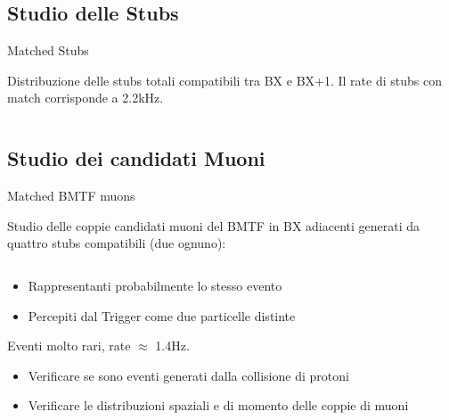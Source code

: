 \documentclass{beamer}
\begin{document}
\subsection{Studio delle Stubs}
\begin{frame}{Matched Stubs}

Distribuzione delle stubs totali compatibili tra BX e BX+1. Il rate di stubs con match corrisponde a 2.2kHz. 

\vspace{0.6cm}

\begin{columns}

    \begin{column}{0.5\textwidth}
    \end{column}
    \begin{column}{0.5\textwidth}
    \end{column}
\end{columns}

\vspace{0.5 cm}
    
\end{frame}


\subsection{Studio dei candidati Muoni}

\begin{frame}{Matched BMTF muons}

Studio delle coppie candidati muoni del BMTF in BX adiacenti generati da quattro stubs compatibili (due ognuno):

\begin{columns}

    \begin{column}{0.55\textwidth}
    \begin{itemize}
        \item Rappresentanti probabilmente lo stesso evento
        \item Percepiti dal Trigger come due particelle distinte
    \end{itemize}

    Eventi molto rari, rate $\approx$ 1.4Hz.

    \begin{itemize}
        \item Verificare se sono eventi generati dalla collisione di protoni
        \item Verificare le distribuzioni spaziali e di momento delle coppie di muoni
    \end{itemize}
        
    \end{column}
    \begin{column}{0.5\textwidth}
    \end{column}
\end{columns}
    
\end{frame}
\end{document}
